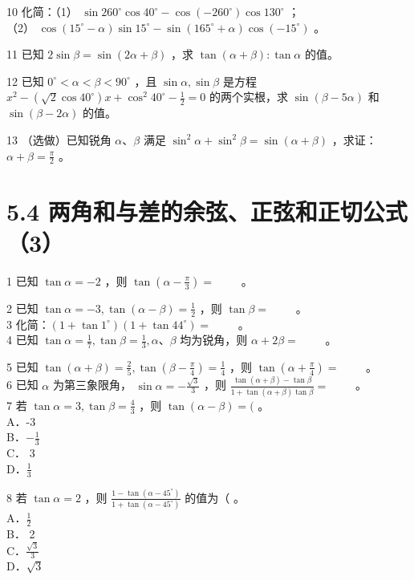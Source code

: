 \documentclass[10pt]{article}
\begin{document}
10 化简：（1） \(\sin 260^{\circ} \cos 40^{\circ}-\cos \left(-260^{\circ}\right) \cos 130^{\circ}\) ；\\
（2） \(\cos \left(15^{\circ}-\alpha\right) \sin 15^{\circ}-\sin \left(165^{\circ}+\alpha\right) \cos \left(-15^{\circ}\right)\) 。

11 已知 \(2 \sin \beta=\sin (2 \alpha+\beta)\) ，求 \(\tan (\alpha+\beta): \tan \alpha\) 的值。

12 已知 \(0^{\circ}<\alpha<\beta<90^{\circ}\) ，且 \(\sin \alpha, \sin \beta\) 是方程 \(x^{2}-\left(\sqrt{2} \cos 40^{\circ}\right) x+\cos ^{2} 40^{\circ}-\frac{1}{2}=0\) 的两个实根，求 \(\sin (\beta-5 \alpha)\) 和 \(\sin (\beta-2 \alpha)\) 的值。

13 （选做）已知锐角 \(\alpha 、 \beta\) 满足 \(\sin ^{2} \alpha+\sin ^{2} \beta=\sin (\alpha+\beta)\) ，求证：\(\alpha+\beta=\frac{\pi}{2}\) 。

\section*{5.4 两角和与差的余弦、正弦和正切公式（3）}
1 已知 \(\tan \alpha=-2\) ，则 \(\tan \left(\alpha-\frac{\pi}{3}\right)=\) \(\qquad\)。

2 已知 \(\tan \alpha=-3, \tan (\alpha-\beta)=\frac{1}{2}\) ，则 \(\tan \beta=\) \(\qquad\)。\\
3 化简：\(\left(1+\tan 1^{\circ}\right)\left(1+\tan 44^{\circ}\right)=\) \(\qquad\)。\\
4 已知 \(\tan \alpha=\frac{1}{7}, \tan \beta=\frac{1}{3}, \alpha 、 \beta\) 均为锐角，则 \(\alpha+2 \beta=\) \(\qquad\)。

5 已知 \(\tan (\alpha+\beta)=\frac{2}{5}, \tan \left(\beta-\frac{\pi}{4}\right)=\frac{1}{4}\) ，则 \(\tan \left(\alpha+\frac{\pi}{4}\right)=\) \(\qquad\)。\\
6 已知 \(\alpha\) 为第三象限角， \(\sin \alpha=-\frac{\sqrt{3}}{3}\) ，则 \(\frac{\tan (\alpha+\beta)-\tan \beta}{1+\tan (\alpha+\beta) \tan \beta}=\) \(\qquad\)。\\
7 若 \(\tan \alpha=3, \tan \beta=\frac{4}{3}\) ，则 \(\tan (\alpha-\beta)=(\) 。\\
A．-3\\
B．\(-\frac{1}{3}\)\\
C． 3\\
D．\(\frac{1}{3}\)

8 若 \(\tan \alpha=2\) ，则 \(\frac{1-\tan \left(\alpha-45^{\circ}\right)}{1+\tan \left(\alpha-45^{\circ}\right)}\) 的值为（ 。\\
A．\(\frac{1}{2}\)\\
B． 2\\
C．\(\frac{\sqrt{3}}{3}\)\\
D．\(\sqrt{3}\)
\end{document}
